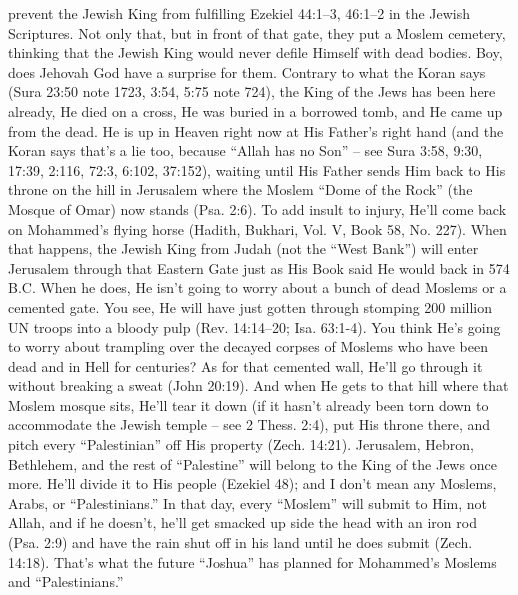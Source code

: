 {prevent the Jewish King from fulfilling Ezekiel
44:1--3, 46:1--2 in the Jewish Scriptures. Not
only that, but in front of that gate, they put a
Moslem cemetery, thinking that the Jewish
King would never defile Himself with dead
bodies.
Boy, does Jehovah God have a surprise for
them. Contrary to what the Koran says (Sura
23:50 note 1723, 3:54, 5:75 note 724), the
King of the Jews has been here already, He
died on a cross, He was buried in a borrowed
tomb, and He came up from the dead. He is up
in Heaven right now at His Father’s right hand
(and the Koran says that’s a lie too, because
“Allah has no Son” -- see Sura 3:58, 9:30,
17:39, 2:116, 72:3, 6:102, 37:152), waiting
until His Father sends Him back to His throne
on the hill in Jerusalem where the Moslem
“Dome of the Rock” (the Mosque of Omar)
now stands (Psa. 2:6). To add insult to injury,
He’ll come back on Mohammed’s flying horse
(Hadith, Bukhari, Vol. V, Book 58, No. 227).
When that happens, the Jewish King from
Judah (not the “West Bank”) will enter
Jerusalem through that Eastern Gate just as His
Book said He would back in 574 B.C. When he
does, He isn’t going to worry about a bunch of
dead Moslems or a cemented gate. You see, He
will have just gotten through stomping 200
million UN troops into a bloody pulp (Rev.
14:14--20; Isa. 63:1-4). You think He’s going
to worry about trampling over the decayed
corpses of Moslems who have been dead and in
Hell for centuries? As for that cemented wall,
He’ll go through it without breaking a sweat
(John 20:19). And when He gets to that hill
where that Moslem mosque sits, He’ll tear it
down (if it hasn’t already been torn down to
accommodate the Jewish temple -- see 2 Thess.
2:4), put His throne there, and pitch every
“Palestinian” off His property (Zech. 14:21).
Jerusalem, Hebron, Bethlehem, and the rest
of “Palestine” will belong to the King of the
Jews once more. He’ll divide it to His people
(Ezekiel 48); and I don’t mean any Moslems,
Arabs, or “Palestinians.” In that day, every
“Moslem” will submit to Him, not Allah, and if
he doesn’t, he’ll get smacked up side the head
with an iron rod (Psa. 2:9) and have the rain
shut off in his land until he does submit (Zech.
14:18). That’s what the future “Joshua” has
planned for Mohammed’s Moslems and
“Palestinians.”}
\